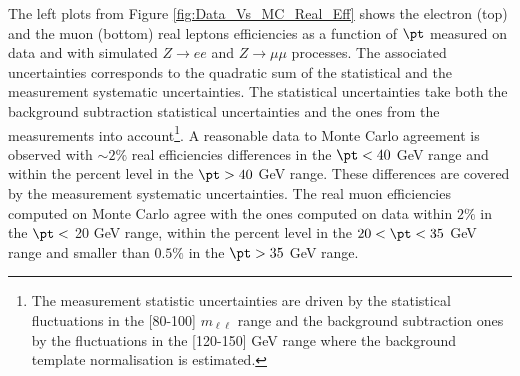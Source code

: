 	The left plots from Figure \ref{fig:Data_Vs_MC_Real_Eff} shows the electron (top) and the muon (bottom) real leptons efficiencies as a function of $\pt$ measured on data and with simulated $Z\rightarrow ee$ and $Z\rightarrow\mu\mu$ processes. The associated uncertainties corresponds to the quadratic sum of the statistical and the measurement systematic uncertainties. The statistical uncertainties take both the background subtraction statistical uncertainties and the ones from the measurements into account\footnote{The measurement statistic uncertainties are driven by the statistical fluctuations in the [80-100] $m_{\ell\ell}$ range and the background subtraction ones by the fluctuations in the [120-150] GeV range where the background template normalisation is estimated.}. A reasonable data to Monte Carlo agreement is observed with $\sim2\%$ real efficiencies differences in the $\pt < 40$ GeV range and within the percent level in the $\pt > 40$ GeV range. These differences are covered by the measurement systematic uncertainties. The real muon efficiencies computed on Monte Carlo agree with the ones computed on data within $2\%$ in the $\pt <$ 20 GeV range, within the percent level in the $20 < \pt < 35$ GeV range and smaller than $0.5\%$ in the $\pt > 35$ GeV range.
				 
